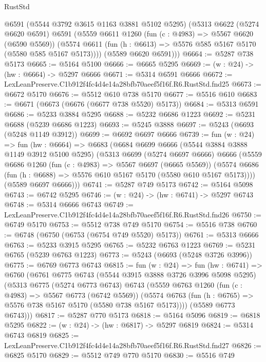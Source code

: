 \begin{lexlean}{RustStd}
\begin{coremodule}
      @6591
      (@5544 @3792 @3615 @1163 @3881 @5102 @5295)
      (@5313
        @6622
        (@5274 @6620 @6591)
        @6591
        (@5559
          @6611
          @1260
          (fun (c : @4983) => @5567 @6620 (@6590 @5569))
          (@5574 @6611 (fun (h : @6613) => @5576 @585 @5167 @5170 (@5580 @585 @5167 @5173))))
        (@5589 @6620 @6591)))
@6664 := @5287 @738 @5173
@6665 := @5164 @5100
@6666 := @6665 @5295
@6669 := (w : @24) -> (hw : @6664) -> @5297 @6666
@6671 := @5314 @6591 @6666
@6672 := LexLeanPreserve.C1b912f4fc4d4e14a28bfb70aeef5f16f.R6.RustStd.fnd25
@6673 := @6672 @5170
@6676 := @5512 @610 @738 @5170
@6677 := @5516 @610
@6683 := @6671 (@6673 (@6676 (@6677 @738 @5520) @5173))
@6684 := @5313 @6591
@6686 := @5233 @3884 @5295
@6688 := @5232 @6686 @1223
@6692 := @5231 @6688 (@5239 @6686 @1223)
@6693 := @5245 @3888
@6697 := @5243 (@6693 (@5248 @1149 @3912))
@6699 := @6692 @6697 @6666
@6739 := fun (w : @24) =>
  fun (hw : @6664) =>
  @6683
    (@6684
      @6699
      @6666
      (@5544 @3884 @3888 @1149 @3912 @5100 @5295)
      (@5313
        @6699
        (@5274 @6697 @6666)
        @6666
        (@5559
          @6686
          @1260
          (fun (c : @4983) => @5567 @6697 (@6665 @5569))
          (@5574 @6686 (fun (h : @6688) => @5576 @610 @5167 @5170 (@5580 @610 @5167 @5173))))
        (@5589 @6697 @6666)))
@6741 := @5287 @749 @5173
@6742 := @5164 @5098
@6743 := @6742 @5295
@6746 := (w : @24) -> (hw : @6741) -> @5297 @6743
@6748 := @5314 @6666 @6743
@6749 := LexLeanPreserve.C1b912f4fc4d4e14a28bfb70aeef5f16f.R6.RustStd.fnd26
@6750 := @6749 @5170
@6753 := @5512 @738 @749 @5170
@6754 := @5516 @738
@6760 := @6748 (@6750 (@6753 (@6754 @749 @5520) @5173))
@6761 := @5313 @6666
@6763 := @5233 @3915 @5295
@6765 := @5232 @6763 @1223
@6769 := @5231 @6765 (@5239 @6763 @1223)
@6773 := @5243 (@6693 (@5248 @3726 @3996))
@6775 := @6769 @6773 @6743
@6815 := fun (w : @24) =>
  fun (hw : @6741) =>
  @6760
    (@6761
      @6775
      @6743
      (@5544 @3915 @3888 @3726 @3996 @5098 @5295)
      (@5313
        @6775
        (@5274 @6773 @6743)
        @6743
        (@5559
          @6763
          @1260
          (fun (c : @4983) => @5567 @6773 (@6742 @5569))
          (@5574 @6763 (fun (h : @6765) => @5576 @738 @5167 @5170 (@5580 @738 @5167 @5173))))
        (@5589 @6773 @6743)))
@6817 := @5287 @770 @5173
@6818 := @5164 @5096
@6819 := @6818 @5295
@6822 := (w : @24) -> (hw : @6817) -> @5297 @6819
@6824 := @5314 @6743 @6819
@6825 := LexLeanPreserve.C1b912f4fc4d4e14a28bfb70aeef5f16f.R6.RustStd.fnd27
@6826 := @6825 @5170
@6829 := @5512 @749 @770 @5170
@6830 := @5516 @749

\end{coremodule}
\end{lexlean}
